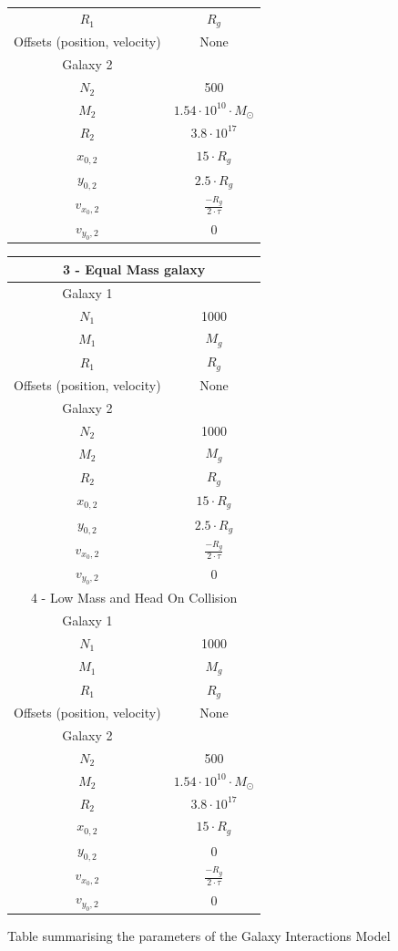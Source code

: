 \documentclass[a4paper,12pt]{article}
\begin{document}
\begin{figure}[ht!]
\begin{tabular}{|c|c|}
 $R_1$ & $R_g$\\
 Offsets (position, velocity) & None\\
 \hline
 Galaxy 2 & \\
 $N_2$ & 500\\
 $M_2$ & $1.54\cdot10^10\cdot M_\odot$\\
 $R_2$ & $3.8\cdot 10^{17}$\\
 $x_{0,2}$ & $15\cdot R_g$\\
 $y_{0,2}$ & $2.5\cdot R_g$\\
 $v_{x_0, 2}$ & $\frac{-R_g}{2\cdot\tau}$\\
 $v_{y_0, 2}$ & 0\\
\hline\hline
\end{tabular}
\end{figure}

\begin{figure}[ht!]
\centering
\begin{tabular}{|c|c|}
\hline
\multicolumn{2}{|c|}{3 - Equal Mass galaxy}\\
\hline
 Galaxy 1 & \\
 $N_1$ & 1000\\
 $M_1$ & $M_g$\\
 $R_1$ & $R_g$\\
 Offsets (position, velocity) & None\\
 Galaxy 2 & \\
 $N_2$ & 1000\\
 $M_2$ & $M_g$\\
 $R_2$ & $R_g$\\
 $x_{0,2}$ & $15\cdot R_g$\\
 $y_{0,2}$ & $2.5\cdot R_g$\\
 $v_{x_0, 2}$ & $\frac{-R_g}{2\cdot\tau}$\\
 $v_{y_0, 2}$ & 0\\
\hline\hline
\multicolumn{2}{|c|}{4 - Low Mass and Head On Collision}\\
\hline
 Galaxy 1 & \\
 $N_1$ & 1000\\
 $M_1$ & $M_g$\\
 $R_1$ & $R_g$\\
 Offsets (position, velocity) & None\\
 \hline
 Galaxy 2 & \\
 $N_2$ & 500\\
 $M_2$ & $1.54\cdot10^{10}\cdot M_\odot$\\
 $R_2$ & $3.8\cdot 10^{17}$\\
 $x_{0,2}$ & $15\cdot R_g$\\
 $y_{0,2}$ & 0\\
 $v_{x_0, 2}$ & $\frac{-R_g}{2\cdot\tau}$\\
 $v_{y_0, 2}$ & 0\\
\hline
\end{tabular}
\caption{Table summarising the parameters of the Galaxy Interactions Model}
\label{tab:galparams}
\end{figure}
\end{document}
